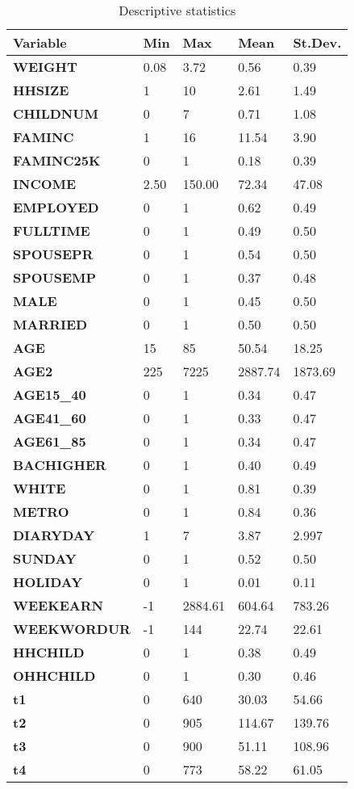 \documentclass[12pt,a4paper]{article}
\begin{document}
\begin{table}
\begin{center}
\begin{tabular}{l l l l l}
\textbf{Variable} & \textbf{Min} & \textbf{Max} & \textbf{Mean} & \textbf{St.Dev.} \\
\hline
\textbf{WEIGHT} & 0.08 & 3.72 & 0.56 & 0.39 \\
\textbf{HHSIZE} & 1 & 10 & 2.61 & 1.49 \\
\textbf{CHILDNUM} & 0 & 7 & 0.71 & 1.08 \\
\textbf{FAMINC} & 1 & 16 & 11.54 & 3.90 \\
\textbf{FAMINC25K} & 0 & 1 & 0.18 & 0.39 \\
\textbf{INCOME} & 2.50 & 150.00 & 72.34 & 47.08 \\
\textbf{EMPLOYED} & 0 & 1 & 0.62 & 0.49 \\
\textbf{FULLTIME} & 0 & 1 & 0.49 & 0.50 \\
\textbf{SPOUSEPR} & 0 & 1 & 0.54 & 0.50 \\
\textbf{SPOUSEMP} & 0 & 1 & 0.37 & 0.48 \\
\textbf{MALE} & 0 & 1 & 0.45 & 0.50 \\
\textbf{MARRIED} & 0 & 1 & 0.50 & 0.50 \\
\textbf{AGE} & 15 & 85 & 50.54 & 18.25 \\
\textbf{AGE2} & 225 & 7225 & 2887.74 & 1873.69 \\
\textbf{AGE15\_40} & 0 & 1 & 0.34 & 0.47 \\
\textbf{AGE41\_60} & 0 & 1 & 0.33 & 0.47 \\
\textbf{AGE61\_85} & 0 & 1 & 0.34 & 0.47 \\
\textbf{BACHIGHER} & 0 & 1 & 0.40 & 0.49 \\
\textbf{WHITE} & 0 & 1 & 0.81 & 0.39 \\
\textbf{METRO} & 0 & 1 & 0.84 & 0.36 \\
\textbf{DIARYDAY} & 1 & 7 & 3.87 & 2.997 \\
\textbf{SUNDAY} & 0 & 1 & 0.52 & 0.50 \\
\textbf{HOLIDAY} & 0 & 1 & 0.01 & 0.11 \\
\textbf{WEEKEARN} & -1 & 2884.61 & 604.64 & 783.26 \\
\textbf{WEEKWORDUR} & -1 & 144 & 22.74 & 22.61 \\
\textbf{HHCHILD} & 0 & 1 & 0.38 & 0.49 \\
\textbf{OHHCHILD} & 0 & 1 & 0.30 & 0.46 \\
\textbf{t1} & 0 & 640 & 30.03 & 54.66 \\
\textbf{t2} & 0 & 905 & 114.67 & 139.76 \\
\textbf{t3} & 0 & 900 & 51.11 & 108.96 \\
\textbf{t4} & 0 & 773 & 58.22 & 61.05 \\
\end{tabular}

\caption{\label{tab:stats}Descriptive statistics}
\end{center}
    \end{table}
\end{document}
